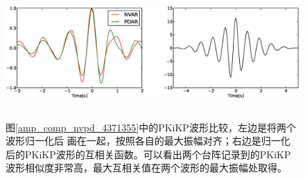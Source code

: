 \begin{figure}[!ht]
	\centering
	\includegraphics[width=16cm,height=5cm]{fig/chap4/wf_cor.eps}
	\caption{图\ref{amp_comp_nvpd_4371355}中的PKiKP波形比较，左边是将两个波形归一化后%
画在一起，按照各自的最大振幅对齐；右边是归一化后的PKiKP波形的互相关函数。可以看出两个台阵记录到的PKiKP波形相似度非常高，最大互相关值在两个波形的最大振幅处取得。}
	\label{wf_cor}
\end{figure}